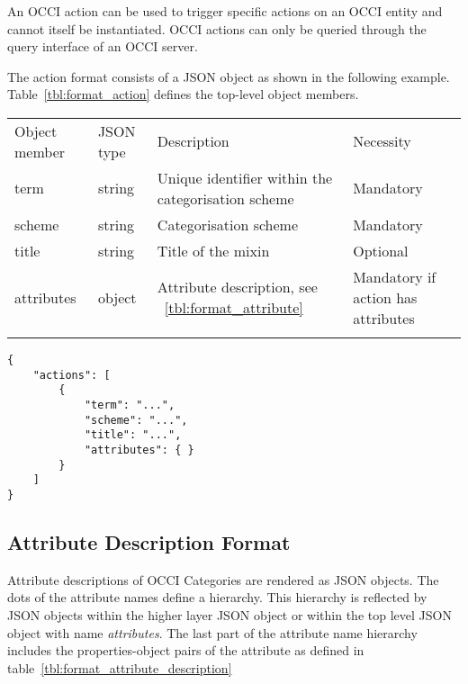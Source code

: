 \documentclass[10pt,a4paper]{article}
\begin{document}
An OCCI action can be used to trigger specific actions on an OCCI entity and cannot itself be 
instantiated. OCCI actions can only be queried through the query interface 
of an OCCI server.

The action format consists of a JSON object as shown in the
following example.
Table~\ref{tbl:format_action} defines the top-level object members.

 {
    \begin{tabular}{llll}
    \toprule
    Object member & JSON type & Description & Necessity\\
    \colrule
    term & string & Unique identifier within the categorisation scheme & Mandatory\\
    scheme & string & Categorisation scheme & Mandatory\\
    title & string & Title of the mixin & Optional\\
    attributes & object & Attribute description, see ~\ref{tbl:format_attribute} & Mandatory if action has attributes\\
    \botrule
    \end{tabular}
}

\begin{verbatim}
{
    "actions": [
        {
            "term": "...",
            "scheme": "...",
            "title": "...",
            "attributes": { }
        }
	]
}
\end{verbatim}

\subsection{Attribute Description Format}
\label{sec:format_attribute_description}

Attribute descriptions of OCCI Categories are rendered as JSON objects. 
The dots of the attribute names define a hierarchy. This hierarchy is reflected 
by JSON objects within the higher layer JSON object or within the top level 
JSON object with name {\em attributes}. The last part of the attribute name
 hierarchy includes the properties-object pairs of the attribute as defined 
 in table~\ref{tbl:format_attribute_description}
\end{document}
